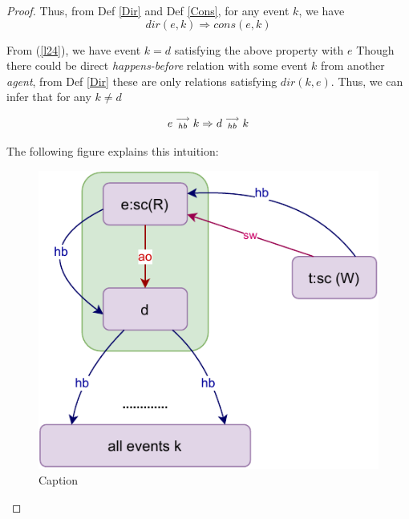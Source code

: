 \begin{proof}
    Thus, from Def \ref{Dir} and Def \ref{Cons}, for any event $k$, we have 
    \[
        dir(e,k) \Rightarrow cons(e,k)
    \]
    
    From (\ref{l24}), we have event $k=d$ satisfying the above property with $e$  
    Though there could be direct \textit{happens-before} relation with some event $k$ from another \textit{agent}, from Def \ref{Dir} these are only relations satisfying $dir(k,e)$. Thus, we can infer that for any $k \neq d$ 
    
    \[
        e\stackrel{\longrightarrow}{_{hb}}k \Rightarrow d\stackrel{\longrightarrow}{_{hb}}k
    \]
    
    The following figure explains this intuition: 
    
    \begin{figure}[H]
        \centering
        \includegraphics[scale=0.7]{5.InstructionReordering/3.Lemmas/lemma_proof2_case2.pdf}
        \caption{Caption}
        \label{fig:my_label}
    \end{figure}

\end{proof}

